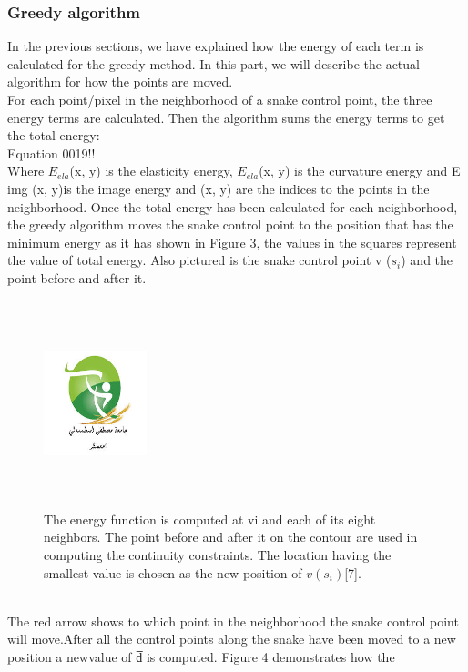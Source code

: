 \subsubsection{Greedy algorithm}
In the previous sections, we have explained how the energy of each term is
calculated for the greedy method. In this part, we will describe the actual
algorithm for how the points are moved.\\
For each point/pixel in the neighborhood of a snake control point, the three
energy terms are calculated. Then the algorithm sums the energy terms to get
the total energy:
\\
Equation 0019!!\\
Where $E_{ela}$(x, y) is the elasticity energy, $E_{ela}$(x, y) is the curvature energy and
E img (x, y)is the image energy and (x, y) are the indices to the points in the
neighborhood.
Once the total energy has been calculated for each neighborhood, the greedy
algorithm moves the snake control point to the position that has the minimum
energy as it has shown in Figure 3, the values in the squares represent the
value of total energy. Also pictured is the snake control point v ($s_i$) and the
point before and after it.
\begin{figure}[h]
        \centering
        \includegraphics[width=3cm, height=6cm]{figurs/logouniv.jpeg}
        \caption{The energy function is computed at vi and each of its eight
        neighbors. The point before and after it on the contour are used in
        computing the continuity constraints. The location having the smallest
        value is chosen as the new position of $v(s_i)$[7].}


\end{figure}\\
The red arrow shows to which point in the neighborhood the snake control
point will move.After all the control points along the snake have been moved
to a new position a newvalue of d̅ is computed. Figure 4 demonstrates how the
